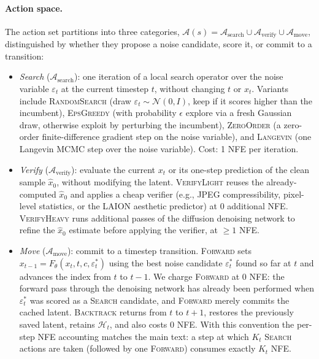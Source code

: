 \paragraph{Action space.}
The action set partitions into three categories, $\mathcal{A}(s) = \mathcal{A}_{\text{search}}\cup\mathcal{A}_{\text{verify}}\cup\mathcal{A}_{\text{move}}$, distinguished by whether they propose a noise candidate, score it, or commit to a transition:
\begin{itemize}\setlength\itemsep{1pt}
  \item \emph{Search} ($\mathcal{A}_{\text{search}}$): one iteration of a local search operator over the noise variable $\varepsilon_t$ at the current timestep $t$, without changing $t$ or $x_t$. Variants include \textsc{RandomSearch} (draw $\varepsilon_t\sim\mathcal{N}(0,I)$, keep if it scores higher than the incumbent), \textsc{EpsGreedy} (with probability $\epsilon$ explore via a fresh Gaussian draw, otherwise exploit by perturbing the incumbent), \textsc{ZeroOrder} (a zero-order finite-difference gradient step on the noise variable), and \textsc{Langevin} (one Langevin MCMC step over the noise variable). Cost: 1 NFE per iteration.
  \item \emph{Verify} ($\mathcal{A}_{\text{verify}}$): evaluate the current $x_t$ or its one-step prediction of the clean sample $\hat x_0$, without modifying the latent. \textsc{VerifyLight} reuses the already-computed $\hat x_0$ and applies a cheap verifier (e.g., JPEG compressibility, pixel-level statistics, or the LAION aesthetic predictor) at 0 additional NFE. \textsc{VerifyHeavy} runs additional passes of the diffusion denoising network to refine the $\hat x_0$ estimate before applying the verifier, at $\ge 1$ NFE.
  \item \emph{Move} ($\mathcal{A}_{\text{move}}$): commit to a timestep transition. \textsc{Forward} sets $x_{t-1}=F_\theta(x_t,t,c,\varepsilon_t^*)$ using the best noise candidate $\varepsilon_t^*$ found so far at $t$ and advances the index from $t$ to $t-1$. We charge \textsc{Forward} at $0$ NFE: the forward pass through the denoising network has already been performed when $\varepsilon_t^*$ was scored as a \textsc{Search} candidate, and \textsc{Forward} merely commits the cached latent. \textsc{Backtrack} returns from $t$ to $t+1$, restores the previously saved latent, retains $\mathcal{H}_t$, and also costs 0 NFE. With this convention the per-step NFE accounting matches the main text: a step at which $K_t$ \textsc{Search} actions are taken (followed by one \textsc{Forward}) consumes exactly $K_t$ NFE.
\end{itemize}

